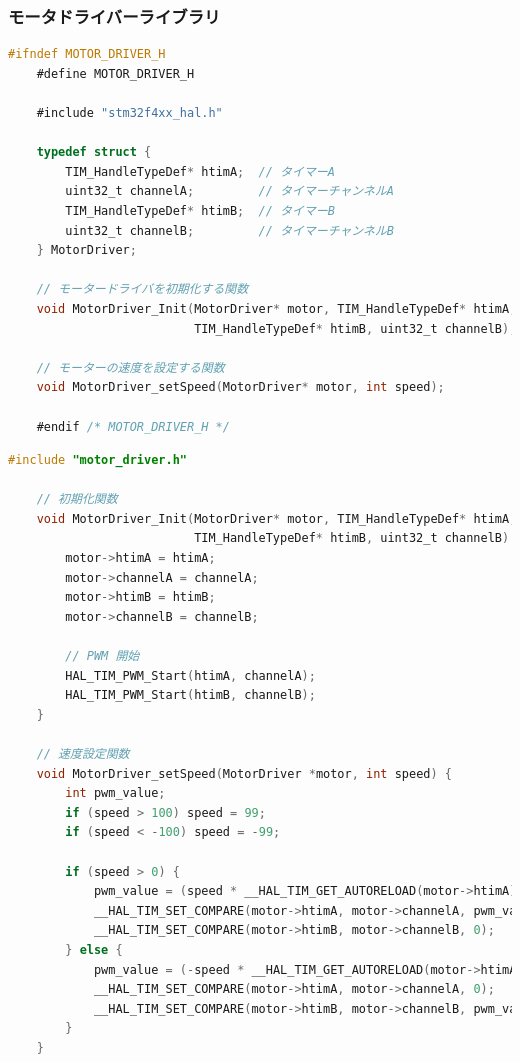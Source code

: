 \subsubsection{モータドライバーライブラリ}

\begin{lstlisting}[language=C, caption=モータドライバーライブラリ(motor\_driver.h)]
    #ifndef MOTOR_DRIVER_H
    #define MOTOR_DRIVER_H
    
    #include "stm32f4xx_hal.h"
    
    typedef struct {
        TIM_HandleTypeDef* htimA;  // タイマーA
        uint32_t channelA;         // タイマーチャンネルA
        TIM_HandleTypeDef* htimB;  // タイマーB
        uint32_t channelB;         // タイマーチャンネルB
    } MotorDriver;
    
    // モータードライバを初期化する関数
    void MotorDriver_Init(MotorDriver* motor, TIM_HandleTypeDef* htimA, uint32_t channelA,
                          TIM_HandleTypeDef* htimB, uint32_t channelB);
    
    // モーターの速度を設定する関数
    void MotorDriver_setSpeed(MotorDriver* motor, int speed);
    
    #endif /* MOTOR_DRIVER_H */
\end{lstlisting}

\begin{lstlisting}[language=C, caption=モータドライバーライブラリ(motor\_driver.c)]
    #include "motor_driver.h"

    // 初期化関数
    void MotorDriver_Init(MotorDriver* motor, TIM_HandleTypeDef* htimA, uint32_t channelA,
                          TIM_HandleTypeDef* htimB, uint32_t channelB) {
        motor->htimA = htimA;
        motor->channelA = channelA;
        motor->htimB = htimB;
        motor->channelB = channelB;
    
        // PWM 開始
        HAL_TIM_PWM_Start(htimA, channelA);
        HAL_TIM_PWM_Start(htimB, channelB);
    }
    
    // 速度設定関数
    void MotorDriver_setSpeed(MotorDriver *motor, int speed) {
        int pwm_value;
        if (speed > 100) speed = 99;
        if (speed < -100) speed = -99;
    
        if (speed > 0) {
            pwm_value = (speed * __HAL_TIM_GET_AUTORELOAD(motor->htimA)) / 100;
            __HAL_TIM_SET_COMPARE(motor->htimA, motor->channelA, pwm_value);
            __HAL_TIM_SET_COMPARE(motor->htimB, motor->channelB, 0);
        } else {
            pwm_value = (-speed * __HAL_TIM_GET_AUTORELOAD(motor->htimA)) / 100;
            __HAL_TIM_SET_COMPARE(motor->htimA, motor->channelA, 0);
            __HAL_TIM_SET_COMPARE(motor->htimB, motor->channelB, pwm_value);
        }
    }
\end{lstlisting}

